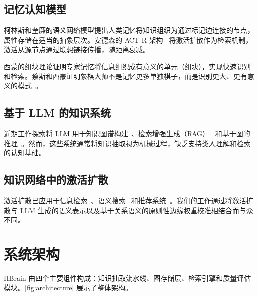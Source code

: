 \documentclass[11pt]{article}
\begin{document}
\subsection{记忆认知模型}

柯林斯和奎廉的语义网络模型提出人类记忆将知识组织为通过标记边连接的节点，属性存储在适当的抽象层次。安德森的 ACT-R 架构~\cite{anderson1983architecture} 将激活扩散作为检索机制，激活从源节点通过联想链接传播，随距离衰减。

西蒙的组块理论证明专家记忆将信息组织成有意义的单元（组块），实现快速识别和检索。蔡斯和西蒙证明象棋大师不是记忆更多单独棋子，而是识别更大、更有意义的模式~\cite{chase1973perception}。

\subsection{基于 LLM 的知识系统}

近期工作探索将 LLM 用于知识图谱构建~\cite{pan2024unifying}、检索增强生成（RAG）~\cite{lewis2020retrieval} 和基于图的推理~\cite{edge2024local}。然而，这些系统通常将知识抽取视为机械过程，缺乏支持类人理解和检索的认知基础。

\subsection{知识网络中的激活扩散}

激活扩散已应用于信息检索~\cite{crestani1997application}、语义搜索~\cite{hwang2019semantic} 和推荐系统~\cite{symeonidis2008recommendation}。我们的工作通过将激活扩散与 LLM 生成的语义表示以及基于关系语义的原则性边缘权重校准相结合而与众不同。

\section{系统架构}
\label{sec:architecture}

HBrain 由四个主要组件构成：知识抽取流水线、图存储层、检索引擎和质量评估模块。\cref{fig:architecture} 展示了整体架构。
\end{document}
